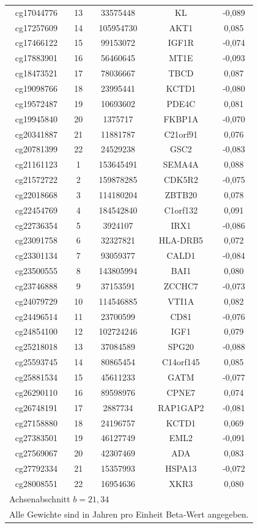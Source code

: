 \documentclass[12pt,a4paper]{article}
\begin{document}
\begin{longtable}{|c|c|c|c|c|}
		cg17044776 & 13 & 33575448 & KL & -0,089 \\
		cg17257609 & 14 & 105954730 & AKT1 & 0,085 \\
		cg17466122 & 15 & 99153072 & IGF1R & -0,074 \\
		cg17883901 & 16 & 56460645 & MT1E & -0,093 \\
		cg18473521 & 17 & 78036667 & TBCD & 0,087 \\
		cg19098766 & 18 & 23995441 & KCTD1 & -0,080 \\
		cg19572487 & 19 & 10693602 & PDE4C & 0,081 \\
		cg19945840 & 20 & 1375717 & FKBP1A & -0,070 \\
		cg20341887 & 21 & 11881787 & C21orf91 & 0,076 \\
		cg20781399 & 22 & 24529238 & GSC2 & -0,083 \\
		cg21161123 & 1 & 153645491 & SEMA4A & 0,088 \\
		cg21572722 & 2 & 159878285 & CDK5R2 & -0,075 \\
		cg22018668 & 3 & 114180204 & ZBTB20 & 0,078 \\
		cg22454769 & 4 & 184542840 & C1orf132 & 0,091 \\
		cg22736354 & 5 & 3924107 & IRX1 & -0,086 \\
		cg23091758 & 6 & 32327821 & HLA-DRB5 & 0,072 \\
		cg23301134 & 7 & 93059377 & CALD1 & -0,084 \\
		cg23500555 & 8 & 143805994 & BAI1 & 0,080 \\
		cg23746888 & 9 & 37153591 & ZCCHC7 & -0,073 \\
		cg24079729 & 10 & 114546885 & VTI1A & 0,082 \\
		cg24496514 & 11 & 23700599 & CD81 & -0,076 \\
		cg24854100 & 12 & 102724246 & IGF1 & 0,079 \\
		cg25218018 & 13 & 37084589 & SPG20 & -0,088 \\
		cg25593745 & 14 & 80865454 & C14orf145 & 0,085 \\
		cg25881534 & 15 & 45611233 & GATM & -0,077 \\
		cg26290110 & 16 & 89598976 & CPNE7 & 0,074 \\
		cg26748191 & 17 & 2887734 & RAP1GAP2 & -0,081 \\
		cg27158880 & 18 & 24196757 & KCTD1 & 0,069 \\
		cg27383501 & 19 & 46127749 & EML2 & -0,091 \\
		cg27569067 & 20 & 42307469 & ADA & 0,083 \\
		cg27792334 & 21 & 15357993 & HSPA13 & -0,072 \\
		cg28008551 & 22 & 16954636 & XKR3 & 0,080 \\
		\hline
		\multicolumn{5}{l}{\footnotesize Achsenabschnitt \(b = 21,34\)} \\
		\multicolumn{5}{l}{\footnotesize Alle Gewichte sind in Jahren pro Einheit Beta‑Wert angegeben.} \\
	\end{longtable}
	
\end{document}
